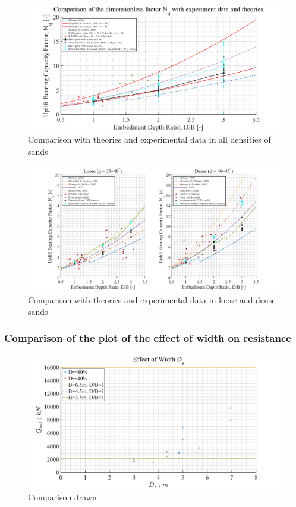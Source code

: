 \documentclass[a4paper, nobind]{templates/ociamthesis}
\begin{document}
\begin{figure}[H]
\includegraphics[width=1\linewidth]{myfigureeeeee/comparisonwiththeories} \caption{Comparison with theories and experimental data in all densities of sands}\label{fig:unnamed-chunk-31}
\end{figure}

\begin{figure}[H]
\includegraphics[width=1\linewidth]{myfigureeeeee/comparisonwiththeories_loosedense} \caption{Comparison with theories and experimental data in loose and dense sands}\label{fig:unnamed-chunk-32}
\end{figure}

\hypertarget{comparison-of-the-plot-of-the-effect-of-width-on-resistance}{%
\subsubsection{Comparison of the plot of the effect of width on resistance}\label{comparison-of-the-plot-of-the-effect-of-width-on-resistance}}

\begin{figure}[H]
\includegraphics[width=1\linewidth]{myfigureeeeee/Comparison} \caption{Comparison drawn}\label{fig:unnamed-chunk-33}
\end{figure}
\end{document}
